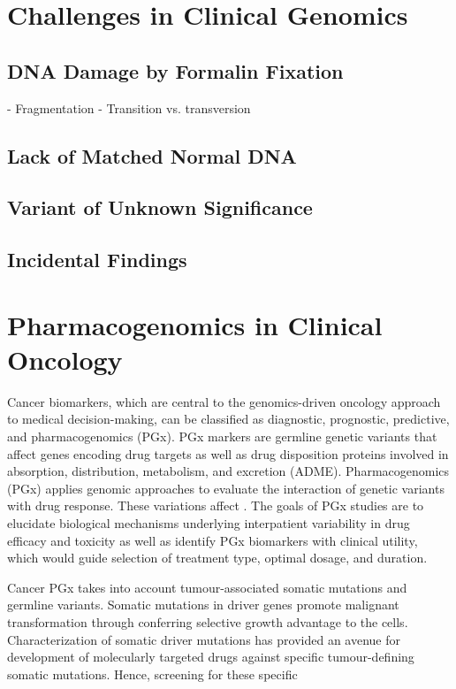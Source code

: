\section{Challenges in Clinical Genomics}
\label{sec:ChallengesinClinicalGenomics}

\subsection{DNA Damage by Formalin Fixation}
- Fragmentation
- Transition vs. transversion

\subsection{Lack of Matched Normal DNA}

\subsection{Variant of Unknown Significance}

\subsection{Incidental Findings}

\section{Pharmacogenomics in Clinical Oncology}
\label{sec:PharmacogenomicsinClinicalOncology}

Cancer biomarkers, which are central to the genomics-driven oncology approach to medical decision-making, can be classified as diagnostic, prognostic, predictive, and pharmacogenomics (PGx). PGx markers are germline genetic variants that affect genes encoding drug targets as well as drug disposition proteins involved in absorption, distribution, metabolism, and excretion (ADME).
Pharmacogenomics (PGx) applies genomic approaches to evaluate the interaction of genetic variants with drug response. These variations affect . The goals of PGx studies are to elucidate biological mechanisms underlying interpatient variability in drug efficacy and toxicity as well as identify PGx biomarkers with clinical utility, which would guide selection of treatment type, optimal dosage, and duration.

Cancer PGx takes into account tumour-associated somatic mutations and germline variants. Somatic mutations in driver genes promote malignant transformation through conferring selective growth advantage to the cells. Characterization of somatic driver mutations has provided an avenue for development of molecularly targeted drugs against specific tumour-defining somatic mutations. Hence, screening for these specific

